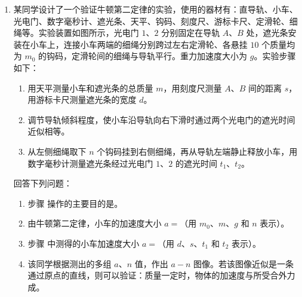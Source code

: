 \documentclass[\gkver]{gaokaozhenti}
\begin{document}
\begin{enumerate}
{（3）根据 $ \rho = \frac{\pi U d^{2}}{4IL} $ 可知 $ U = \frac{4\rho IL}{\pi d^{2}} $，故 $ U-IL $ 图像的斜率为 $ k = \frac{4\rho}{\pi d^{2}} $，得 $ \frac{4\rho}{\pi d^{2}} = \frac{2.3}{70 \times 10^{-3}} $，代入数值解得 $ \rho = 6.4 \times 10^{-6} \UOm $。

（4）干电池的内阻增大，不考虑电表内阻的影响下，实验中测量的 $ U $ 和通过的电流 $ I $ 还是真实值，对实验测量结果无影响。
}
\item
某同学设计了一个验证牛顿第二定律的实验，使用的器材有：直导轨、小车、光电门、数字毫秒计、遮光条、天平、钩码、刻度尺、游标卡尺、定滑轮、细绳等。实验装置如图所示，光电门 $ 1 $、$ 2 $ 分别固定在导轨 $ A $、$ B $ 处，遮光条安装在小车上，连接小车两端的细绳分别跨过左右定滑轮、各悬挂 $ 10 $ 个质量均为 $ m_{0} $ 的钩码，定滑轮间的细绳与导轨平行。重力加速度大小为 $ g $。实验步骤如下：
\onepicture[w=9.39cm]{}
\begin{enumerate}[label=\roman*.]
	\item 
	用天平测量小车和遮光条的总质量 $ m $，用刻度尺测量 $ A $、$ B $ 间的距离 $ s $，用游标卡尺测量遮光条的宽度 $ d $。
	\item 
	调节导轨倾斜程度，使小车沿导轨向右下滑时通过两个光电门的遮光时间近似相等。
	\item 
	从左侧细绳取下 $ n $ 个钩码挂到右侧细绳，再从导轨左端静止释放小车，用数字毫秒计测量遮光条经过光电门 $ 1 $、$ 2 $ 的遮光时间 $ t_{1} $、$ t_{2} $。
\end{enumerate}
回答下列问题：
\begin{enumerate}
	\item 
	步骤  操作的主要目的是。
	
	\item
	由牛顿第二定律，小车的加速度大小 $ a =$（用 $ m_{0} $、$ m $、$ g $ 和 $ n $ 表示）。
	
	\item
	步骤  中测得的小车加速度大小 $ a =$（用 $ d $、$ s $、$ t_{1} $ 和 $ t_{2} $ 表示）。
	
	\item
	该同学根据测出的多组 $ a $、$ n $ 值，作出 $ a-n $ 图像。若该图像近似是一条通过原点的直线，则可以验证：质量一定时，物体的加速度与所受合外力成。
	

\end{enumerate}
\end{enumerate}
\end{document}
